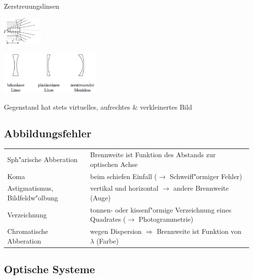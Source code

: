 \begin{minipage}[]{3.5cm}
  Zerstreuungslinsen
\end{minipage}
\begin{minipage}[]{2cm}
  \includegraphics[width=2cm]{./bilder/streuprinzip.png}
\end{minipage}
\begin{minipage}[]{5cm}
  \includegraphics[width=5cm]{./bilder/streulinsen.png}
\end{minipage}
\begin{minipage}[]{7.5cm}
  \small
  Gegenstand hat stets virtuelles, aufrechtes \& verkleinertes Bild
\end{minipage}

\subsection{Abbildungsfehler}
\begin{tabular}{ll}
  Sph"arische Abberation & Brennweite ist Funktion des Abstands zur optischen
  Achse \\
  Koma & beim schiefen Einfall ($\rightarrow$ Schweiff"ormiger Fehler) \\
  Astigmatismus, Bildfeldw"olbung & vertikal und horizontal $\rightarrow$ andere
  Brennweite (Auge) \\
  Verzeichnung & tonnen- oder kissenf"ormige Verzeichnung eines Quadrates
  ($\rightarrow$ Photogrammetrie) \\
  Chromatische Abberation & wegen Dispersion $\Rightarrow$ Brennweite ist
  Funktion von $\lambda$ (Farbe) \\
\end{tabular}

\subsection{Optische Systeme}
